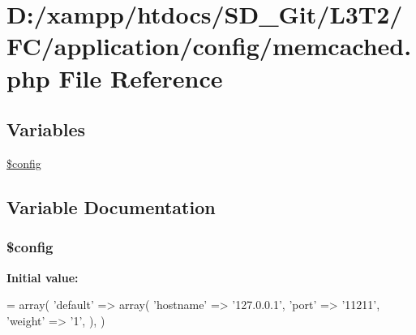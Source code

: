 \hypertarget{application_2config_2memcached_8php}{}\section{D\+:/xampp/htdocs/\+S\+D\+\_\+\+Git/\+L3\+T2/\+F\+C/application/config/memcached.php File Reference}
\label{application_2config_2memcached_8php}
\subsection*{Variables}
\begin{DoxyCompactItemize}
\item 
\hyperlink{application_2config_2memcached_8php_a49c7011be9c979d9174c52a8b83e5d8e}{\$config}
\end{DoxyCompactItemize}


\subsection{Variable Documentation}
\hypertarget{application_2config_2memcached_8php_a49c7011be9c979d9174c52a8b83e5d8e}{}
\subsubsection[{\$config}]{\setlength{\rightskip}{0pt plus 5cm}\$config}\label{application_2config_2memcached_8php_a49c7011be9c979d9174c52a8b83e5d8e}
{\bfseries Initial value\+:}
\begin{DoxyCode}
= array(
    \textcolor{stringliteral}{'default'} => array(
        \textcolor{stringliteral}{'hostname'} => \textcolor{stringliteral}{'127.0.0.1'},
        \textcolor{stringliteral}{'port'}     => \textcolor{stringliteral}{'11211'},
        \textcolor{stringliteral}{'weight'}   => \textcolor{charliteral}{'1'},
    ),
)
\end{DoxyCode}
